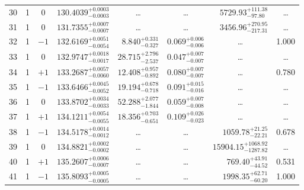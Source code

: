 \begin{table*}[!]
\begin{tabular}{llcrrlrc}
30 & 1 & 0 & $    130.4039_{-      0.0003}^{+      0.0003}$ & \multicolumn{1}{c}{\dots} & \multicolumn{1}{c}{\dots} & $     5729.93_{-       97.80}^{+      111.38}$ & \dots \\[1pt]
31 & 1 & 0 & $    131.7355_{-      0.0007}^{+      0.0007}$ & \multicolumn{1}{c}{\dots} & \multicolumn{1}{c}{\dots} & $     3456.96_{-      217.31}^{+      270.95}$ & \dots \\[1pt]
32 & 1 & $-1$ & $    132.6169_{-      0.0054}^{+      0.0051}$ & $       8.840_{-       0.327}^{+       0.331}$ & $       0.069_{-       0.006}^{+       0.006}$ & \multicolumn{1}{c}{\dots} & 1.000\\[1pt]
33 & 1 & 0 & $    132.9747_{-      0.0017}^{+      0.0018}$ & $      28.715_{-       2.537}^{+       2.796}$ & $       0.047_{-       0.007}^{+       0.007}$ & \multicolumn{1}{c}{\dots} & \dots \\[1pt]
34 & 1 & $+1$ & $    133.2687_{-      0.0060}^{+      0.0057}$ & $      12.408_{-       0.892}^{+       0.957}$ & $       0.080_{-       0.007}^{+       0.007}$ & \multicolumn{1}{c}{\dots} & 0.780\\[1pt]
35 & 1 & $-1$ & $    133.6466_{-      0.0052}^{+      0.0045}$ & $      19.194_{-       0.718}^{+       0.678}$ & $       0.091_{-       0.016}^{+       0.015}$ & \multicolumn{1}{c}{\dots} & \dots \\[1pt]
36 & 1 & 0 & $    133.8702_{-      0.0033}^{+      0.0034}$ & $      52.288_{-       1.844}^{+       2.077}$ & $       0.059_{-       0.008}^{+       0.007}$ & \multicolumn{1}{c}{\dots} & \dots \\[1pt]
37 & 1 & $+1$ & $    134.1211_{-      0.0055}^{+      0.0054}$ & $      18.356_{-       0.651}^{+       0.703}$ & $       0.109_{-       0.023}^{+       0.026}$ & \multicolumn{1}{c}{\dots} & \dots \\[1pt]
38 & 1 & $-1$ & $    134.5178_{-      0.0012}^{+      0.0014}$ & \multicolumn{1}{c}{\dots} & \multicolumn{1}{c}{\dots} & $     1059.78_{-       22.21}^{+       21.25}$ & 0.678\\[1pt]
39 & 1 & 0 & $    134.8821_{-      0.0002}^{+      0.0002}$ & \multicolumn{1}{c}{\dots} & \multicolumn{1}{c}{\dots} & $    15904.15_{-     1287.82}^{+     1068.92}$ & \dots \\[1pt]
40 & 1 & $+1$ & $    135.2607_{-      0.0007}^{+      0.0006}$ & \multicolumn{1}{c}{\dots} & \multicolumn{1}{c}{\dots} & $      769.40_{-       44.52}^{+       43.91}$ & 0.531\\[1pt]
41 & 1 & $-1$ & $    135.8093_{-      0.0005}^{+      0.0005}$ & \multicolumn{1}{c}{\dots} & \multicolumn{1}{c}{\dots} & $     1998.35_{-       60.20}^{+       62.71}$ & 1.000\\[1pt]

\end{tabular}
\end{table*}

